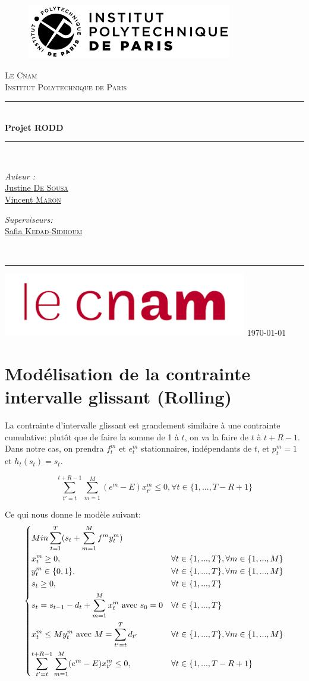 \documentclass{article}
\newcommand{\mailRef}[3]{\href{mailto:#3}{#1 \textsc{#2}}}
\newcommand{\pageDeGarde}[6]{
	\begin{titlepage}\center
		
		\begin{figure}
			\begin{center}
				#5
			\end{center}
		\end{figure}
		
		\textsc{\LARGE #2}\\ \vfill
		\rule[5mm]{\textwidth}{0.5mm} \\ \vfill
		{ \huge \bfseries\centering #1}\\ \vfill
		\rule[5mm]{\textwidth}{0.5mm} \\ \vfill
		
		\begin{minipage}{0.4\textwidth}
			\begin{flushleft} \large
				\emph{Auteur :}\\ #3
			\end{flushleft}
		\end{minipage}
		\begin{minipage}{0.4\textwidth}
			\begin{flushright} \large
				\emph{Superviseurs:} \\ #4
			\end{flushright}
		\end{minipage}\\ \vfill
		
		\rule{0.8\textwidth}{0.5mm} \vfill
		#6  \vfill
		{\large \today}
	\end{titlepage}
	\newpage
}
\begin{document}
	
	\pageDeGarde{ Projet RODD
	}{ Le Cnam \\ Institut Polytechnique de Paris 
	}{
		\mailRef{Justine}{De Sousa}{justine.desousa6@gmail.com}\\
		\mailRef{Vincent}{Maron}{vincent.maron@telecom-paris.fr}
	}{ \mailRef{Safia}{Kedad-Sidhoum}{safia.kedad_sidhoum@cnam.fr}
	}{ \includegraphics[width=0.8\textwidth]{logos/logo_ipp.png}
	}{ \includegraphics[width=0.8\textwidth]{logos/logoCnam.png}
	}
	
	\section{Modélisation de la contrainte intervalle glissant (Rolling)}
	La contrainte d'intervalle glissant est grandement similaire à une contrainte cumulative: plutôt que de faire la somme de 1 à $t$, on va la faire de $t$ à $t+R-1$. Dans notre cas, on prendra $f^m_t$ et $e^m_t$ stationnaires, indépendants de $t$, et $p_t^m = 1$ et $h_t(s_t) = s_t$.
	
	
	\huge{$$\sum_{t'=t}^{t+R-1} \sum_{m=1}^{M} (e^m-E)x_{t'}^{m}  \leq 0, \forall t\in \{1,...,T-R+1\} $$}
	
	\normalsize
	
	Ce qui nous donne le modèle suivant:
	\Large
	$$
	\begin{dcases}
		Min \sum_{t=1}^T (s_t + \sum_{m=1}^M f^m y_t^m )\\
		x_t^m \geq 0, &\forall t \in \{1,...,T\},  \forall m \in \{1,...,M\}  \\
		y_t^m \in \{0,1\}, &\forall t \in \{1,...,T\},  \forall m \in \{1,...,M\}  \\
		s_t \geq 0, &\forall t \in \{1,...,T\}\\
		s_t = s_{t-1} - d_t + \sum_{m=1}^M x_t^m \text{ avec $s_0 = 0$}&\forall t \in \{1,...,T\} \\
		x_t^m \leq M y_t^m \text{ avec $M = \sum_{t'=t}^T d_{t'}$}&\forall t \in \{1,...,T\},  \forall m \in \{1,...,M\}\\
		\sum_{t'=t}^{t+R-1} \sum_{m=1}^{M} (e^m-E)x_{t'}^{m}  \leq 0, &\forall t\in \{1,...,T-R+1\}\\
	\end{dcases}$$
	\newpage
\end{document}
